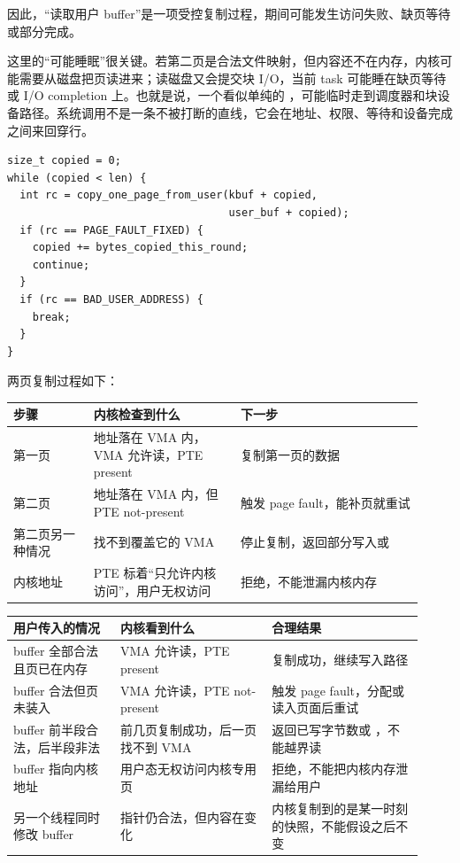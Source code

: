 因此，“读取用户 buffer”是一项受控复制过程，期间可能发生访问失败、缺页等待或部分完成。

这里的“可能睡眠”很关键。若第二页是合法文件映射，但内容还不在内存，内核可能需要从磁盘把页读进来；读磁盘又会提交块 I/O，当前 task 可能睡在缺页等待或 I/O completion 上。也就是说，一个看似单纯的 ，可能临时走到调度器和块设备路径。系统调用不是一条不被打断的直线，它会在地址、权限、等待和设备完成之间来回穿行。

\begin{lstlisting}
size_t copied = 0;
while (copied < len) {
  int rc = copy_one_page_from_user(kbuf + copied,
                                   user_buf + copied);
  if (rc == PAGE_FAULT_FIXED) {
    copied += bytes_copied_this_round;
    continue;
  }
  if (rc == BAD_USER_ADDRESS) {
    break;
  }
}
\end{lstlisting}

两页复制过程如下：

\begin{longtable}{|L{0.18\linewidth}|L{0.33\linewidth}|L{0.41\linewidth}|}
\toprule
步骤 & 内核检查到什么 & 下一步 \\
\midrule
第一页 & 地址落在 VMA 内，VMA 允许读，PTE present & 复制第一页的数据 \\\tablerowrule
第二页 & 地址落在 VMA 内，但 PTE not-present & 触发 page fault，能补页就重试 \\\tablerowrule
第二页另一种情况 & 找不到覆盖它的 VMA & 停止复制，返回部分写入或  \\\tablerowrule
内核地址 & PTE 标着“只允许内核访问”，用户无权访问 & 拒绝，不能泄漏内核内存 \\
\bottomrule
\end{longtable}

\begin{longtable}{|L{0.24\linewidth}|L{0.34\linewidth}|L{0.34\linewidth}|}
\toprule
用户传入的情况 & 内核看到什么 & 合理结果 \\
\midrule
buffer 全部合法且页已在内存 & VMA 允许读，PTE present & 复制成功，继续写入路径 \\\tablerowrule
buffer 合法但页未装入 & VMA 允许读，PTE not-present & 触发 page fault，分配或读入页面后重试 \\\tablerowrule
buffer 前半段合法，后半段非法 & 前几页复制成功，后一页找不到 VMA & 返回已写字节数或 ，不能越界读 \\\tablerowrule
buffer 指向内核地址 & 用户态无权访问内核专用页 & 拒绝，不能把内核内存泄漏给用户 \\\tablerowrule
另一个线程同时修改 buffer & 指针仍合法，但内容在变化 & 内核复制到的是某一时刻的快照，不能假设之后不变 \\
\bottomrule
\end{longtable}

